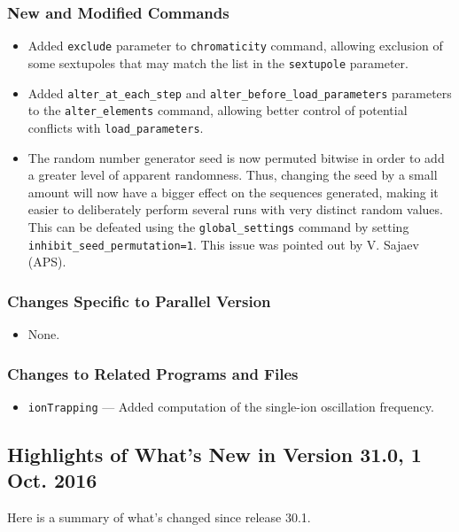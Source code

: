 \documentclass[11pt]{article}
\begin{document}
\subsubsection{New and Modified Commands}
\begin{itemize}
\item Added \verb|exclude| parameter to \verb|chromaticity| command, allowing exclusion of some sextupoles that may 
  match the list in the \verb|sextupole| parameter.
\item Added \verb|alter_at_each_step| and \verb|alter_before_load_parameters| parameters to the \verb|alter_elements| command,
  allowing better control of potential conflicts with \verb|load_parameters|.
\item The random number generator seed is now permuted bitwise in order to add a greater level of apparent randomness.
  Thus, changing the seed by a small amount will now have a bigger effect on the sequences generated, making it easier to
  deliberately perform several runs with very distinct random values.
  This can be defeated using the \verb|global_settings| command by setting \verb|inhibit_seed_permutation=1|.
  This issue was pointed out by V. Sajaev (APS).
\end{itemize}

\subsubsection{Changes Specific to Parallel Version}

\begin{itemize}
\item None.
\end{itemize}

\subsubsection{Changes to Related Programs and Files}

\begin{itemize}
\item \verb|ionTrapping| --- Added computation of the single-ion oscillation frequency.
\end{itemize}

\subsection{Highlights of What's New in Version 31.0, 1 Oct. 2016}

Here is a summary of what's changed since release 30.1.
\end{document}
